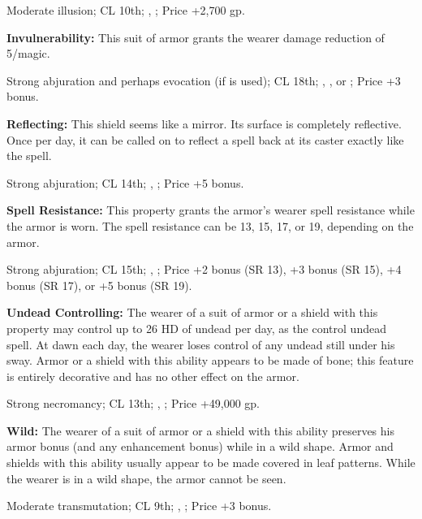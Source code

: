 Moderate illusion; CL 10th; , ; Price +2,700 gp.

\textbf{Invulnerability:} This suit of armor grants the wearer damage reduction of 5/magic.

Strong abjuration and perhaps evocation (if  is used); CL 18th; , ,  or ; Price +3 bonus.

\textbf{Reflecting:} This shield seems like a mirror. Its surface is completely reflective. Once per day, it can be called on to reflect a spell back at its caster exactly like the  spell.

Strong abjuration; CL 14th; , ; Price +5 bonus. 

\textbf{Spell Resistance:} This property grants the armor's wearer spell resistance while the armor is worn. The spell resistance can be 13, 15, 17, or 19, depending on the armor.

Strong abjuration; CL 15th; , ; Price +2 bonus (SR 13), +3 bonus (SR 15), +4 bonus (SR 17), or +5 bonus (SR 19).

\textbf{Undead Controlling:} The wearer of a suit of armor or a shield with this property may control up to 26 HD of undead per day, as the control undead spell. At dawn each day, the wearer loses control of any undead still under his sway. Armor or a shield with this ability appears to be made of bone; this feature is entirely decorative and has no other effect on the armor.

Strong necromancy; CL 13th; , ; Price +49,000 gp.

\textbf{Wild:} The wearer of a suit of armor or a shield with this ability preserves his armor bonus (and any enhancement bonus) while in a wild shape. Armor and shields with this ability usually appear to be made covered in leaf patterns. While the wearer is in a wild shape, the armor cannot be seen.

Moderate transmutation; CL 9th; , ; Price +3 bonus. 